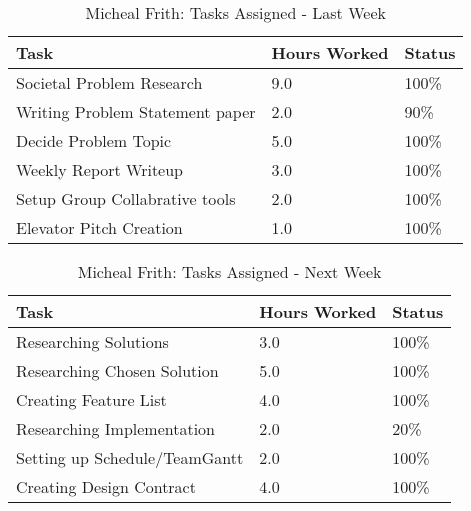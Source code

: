 \documentclass[12pt,article,compsoc]{IEEEtran}
\begin{document}
	\begin{table}[ht]
	\renewcommand{\arraystretch}{1.3}
		\caption{Micheal Frith: Tasks Assigned - Last Week}
		
		\label{Summary of Micheal Frith's activities: this week}
		
		\centering
		\begin{tabular}{p{5.5cm}|p{1cm}|p{1cm}} 
		\hline
		\bfseries 	Task		 		& \bfseries Hours Worked	& \bfseries Status	\\
		\hline\hline	
					Societal Problem Research					& 9.0						& 100\%				\\	%
					Writing Problem Statement paper					& 2.0						& 90\%				\\
					Decide Problem Topic					& 5.0						& 100\%				\\	%
					Weekly Report Writeup					& 3.0						& 100\%				\\
					Setup Group Collabrative tools					& 2.0						& 100\%				\\	%
					Elevator Pitch Creation					& 1.0						& 100\%				\\	%
		\hline
		\end{tabular}
	\end{table}

	\begin{table}[ht]
	\renewcommand{\arraystretch}{1.3}
		\caption{Micheal Frith: Tasks Assigned - Next Week}
		
		\label{Summary of Micheal Frith's activities: this week}
		
		\centering
		\begin{tabular}{p{5.5cm}|p{1cm}|p{1cm}}
		\hline
		\bfseries 	Task		 		& \bfseries Hours Worked	& \bfseries Status	\\
		\hline\hline
					Researching Solutions					& 3.0						& 100\%				\\	%
					Researching Chosen Solution					& 5.0						& 100\%				\\
					Creating Feature List					& 4.0						& 100\%				\\	%
					Researching Implementation					& 2.0						& 20\%				\\
					Setting up Schedule/TeamGantt					& 2.0						& 100\%				\\	%
					Creating Design Contract					& 4.0						& 100\%				\\
		\hline
		\end{tabular}
	\end{table}
\end{document}
